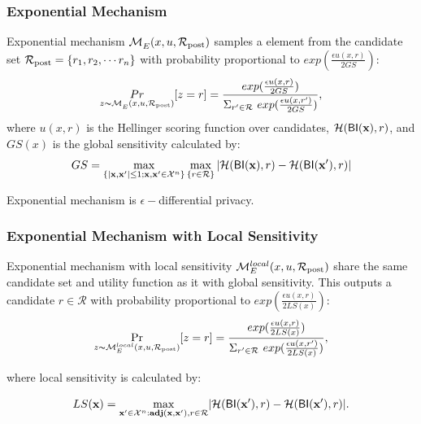 \documentclass[sigconf]{acmart}
\begin{document}
\subsubsection{Exponential Mechanism}

Exponential mechanism $\mathcal{M}_E^{}({x},{u},{\mathcal{R}_{\textup{post}}})$ samples a element from the candidate set $\mathcal{R}_{\textup{post}} = \{r_1, r_2, \cdots r_n\}$ with probability proportional to $exp(\frac{\epsilon u(x,r)}{2 GS})$:
\begin{equation*}
\underset{z \thicksim \mathcal{M}_E^{}({x},{u},{\mathcal{R}_{\textup{post}}}) }{Pr}[z=r] = \frac
{exp(\frac{\epsilon u(x,r)}{2 GS})}
{\Sigma_{r' \in \mathcal{R}}\ exp(\frac{\epsilon u(x,r')}{2 GS})},
\end{equation*}
where $u(x,r)$ is the Hellinger scoring function over candidates, $\mathcal{H}(\mathsf{BI}(\textbf{x}), r)$, and $GS(x)$ is the global sensitivity calculated by:
\begin{equation*}
GS = 
\max_{\{|\textbf{x},\textbf{x}'| \leq 1;\textbf{x},\textbf{x}'\in \mathcal{X}^n\}}\max_{\{r\in \mathcal{R}\}}
|\mathcal{H}(\mathsf{BI}(\textbf{x}), r) - \mathcal{H}(\mathsf{BI}(\textbf{x}'), r)|
\end{equation*}

Exponential mechanism is $\epsilon -$differential privacy\cite{dwork2014algorithmic}.


\subsubsection{Exponential Mechanism with Local Sensitivity}
\label{subsec_emls}
Exponential mechanism with local sensitivity $\mathcal{M}_E^{local}({x},{u},{\mathcal{R}_{\textup{post}}})$ share the same candidate set and utility function as it with global sensitivity. This outputs a candidate $r \in \mathcal{R}$ with probability proportional to $exp(\frac{\epsilon u(x,r)}{2 LS(x)})$:
\begin{equation*}
\underset{z \thicksim \mathcal{M}_E^{local}({x},{u},{\mathcal{R}_{\textup{post}}})}{\Pr}[z=r] = \frac
{exp(\frac{\epsilon u(x,r)}{2 LS(x)})}
{\Sigma_{r' \in \mathcal{R}}\ exp(\frac{\epsilon u(x,r')}{2 LS(x)})},
\end{equation*}

where local sensitivity is calculated by:

\begin{equation*}
LS(\textbf{x})=\max_{\textbf{x}' \in \mathcal{X}^n:\textbf{adj}(\textbf{x},\textbf{x}'), r\in \mathcal{R}}\lvert \mathcal{H}(\mathsf{BI}(\textbf{x}'), r) - \mathcal{H}(\mathsf{BI}(\textbf{x}'), r)\rvert.
\end{equation*}
\end{document}

